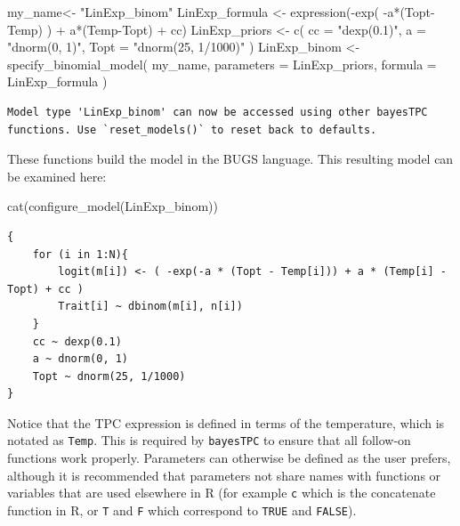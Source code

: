 \documentclass[
]{article}
\newenvironment{Shaded}{\begin{snugshade}}{\end{snugshade}}
\newcommand{\AttributeTok}[1]{\textcolor[rgb]{0.40,0.45,0.13}{#1}}
\newcommand{\FunctionTok}[1]{\textcolor[rgb]{0.28,0.35,0.67}{#1}}
\newcommand{\NormalTok}[1]{\textcolor[rgb]{0.00,0.23,0.31}{#1}}
\newcommand{\OtherTok}[1]{\textcolor[rgb]{0.00,0.23,0.31}{#1}}
\newcommand{\SpecialCharTok}[1]{\textcolor[rgb]{0.37,0.37,0.37}{#1}}
\newcommand{\StringTok}[1]{\textcolor[rgb]{0.13,0.47,0.30}{#1}}
\begin{document}
\begin{Shaded}
\begin{Highlighting}[]
\NormalTok{my\_name}\OtherTok{\textless{}{-}} \StringTok{"LinExp\_binom"}
\NormalTok{LinExp\_formula }\OtherTok{\textless{}{-}} \FunctionTok{expression}\NormalTok{(}\SpecialCharTok{{-}}\FunctionTok{exp}\NormalTok{( }\SpecialCharTok{{-}}\NormalTok{a}\SpecialCharTok{*}\NormalTok{(Topt}\SpecialCharTok{{-}}\NormalTok{Temp) ) }\SpecialCharTok{+}\NormalTok{ a}\SpecialCharTok{*}\NormalTok{(Temp}\SpecialCharTok{{-}}\NormalTok{Topt) }\SpecialCharTok{+}\NormalTok{ cc)}
\NormalTok{LinExp\_priors }\OtherTok{\textless{}{-}} \FunctionTok{c}\NormalTok{( }\AttributeTok{cc =} \StringTok{"dexp(0.1)"}\NormalTok{,}
                    \AttributeTok{a =} \StringTok{"dnorm(0, 1)"}\NormalTok{,}
                    \AttributeTok{Topt  =} \StringTok{"dnorm(25, 1/1000)"}
\NormalTok{                    )}
\NormalTok{LinExp\_binom }\OtherTok{\textless{}{-}} \FunctionTok{specify\_binomial\_model}\NormalTok{( my\_name,}
                                        \AttributeTok{parameters =}\NormalTok{ LinExp\_priors,}
                                        \AttributeTok{formula =}\NormalTok{ LinExp\_formula}
\NormalTok{                                        )}
\end{Highlighting}
\end{Shaded}

\begin{verbatim}
Model type 'LinExp_binom' can now be accessed using other bayesTPC functions. Use `reset_models()` to reset back to defaults.
\end{verbatim}

These functions build the model in the BUGS language. This resulting
model can be examined here:

\begin{Shaded}
\begin{Highlighting}[]
\FunctionTok{cat}\NormalTok{(}\FunctionTok{configure\_model}\NormalTok{(LinExp\_binom))}
\end{Highlighting}
\end{Shaded}

\begin{verbatim}
{
    for (i in 1:N){
        logit(m[i]) <- ( -exp(-a * (Topt - Temp[i])) + a * (Temp[i] - Topt) + cc )
        Trait[i] ~ dbinom(m[i], n[i])
    }
    cc ~ dexp(0.1)
    a ~ dnorm(0, 1)
    Topt ~ dnorm(25, 1/1000)
}
\end{verbatim}

Notice that the TPC expression is defined in terms of the temperature,
which is notated as \texttt{Temp}. This is required by \texttt{bayesTPC}
to ensure that all follow-on functions work properly. Parameters can
otherwise be defined as the user prefers, although it is recommended
that parameters not share names with functions or variables that are
used elsewhere in R (for example \texttt{c} which is the concatenate
function in R, or \texttt{T} and \texttt{F} which correspond to
\texttt{TRUE} and \texttt{FALSE}).
\end{document}
